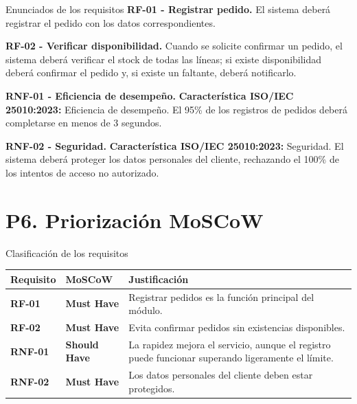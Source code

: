 \documentclass[11pt,a4paper]{article}
\renewcommand{\arraystretch}{1.25}
\begin{document}
\vspace{0.45cm}

\begin{taskbox}{Enunciados de los requisitos}
\textbf{RF-01 - Registrar pedido.} El sistema deberá registrar el pedido con los datos correspondientes.

\textbf{RF-02 - Verificar disponibilidad.} Cuando se solicite confirmar un pedido, el sistema deberá verificar el stock de todas las líneas; si existe disponibilidad deberá confirmar el pedido y, si existe un faltante, deberá notificarlo.

\textbf{RNF-01 - Eficiencia de desempeño.} \textbf{Característica ISO/IEC 25010:2023:} Eficiencia de desempeño. El 95\% de los registros de pedidos deberá completarse en menos de 3 segundos.

\textbf{RNF-02 - Seguridad.} \textbf{Característica ISO/IEC 25010:2023:} Seguridad. El sistema deberá proteger los datos personales del cliente, rechazando el 100\% de los intentos de acceso no autorizado.
\end{taskbox}

\section*{P6. Priorización MoSCoW}
\begin{taskbox}{Clasificación de los requisitos}
\small
\renewcommand{\arraystretch}{1.40}
\begin{tabularx}{\textwidth}{
  >{\centering\arraybackslash\bfseries}m{2.1cm}
  >{\centering\arraybackslash}m{2.8cm}
  >{\RaggedRight\arraybackslash}X
}
\toprule
\textbf{\textcolor{uteqblue}{Requisito}} &
\textbf{\textcolor{uteqblue}{MoSCoW}} &
\textbf{\textcolor{uteqblue}{Justificación}} \\
\midrule
RF-01 & \textcolor{uteqgreen}{\textbf{Must Have}} & Registrar pedidos es la función principal del módulo. \\
RF-02 & \textcolor{uteqgreen}{\textbf{Must Have}} & Evita confirmar pedidos sin existencias disponibles. \\
RNF-01 & \textcolor{uteqgreen}{\textbf{Should Have}} & La rapidez mejora el servicio, aunque el registro puede funcionar superando ligeramente el límite. \\
RNF-02 & \textcolor{uteqgreen}{\textbf{Must Have}} & Los datos personales del cliente deben estar protegidos. \\
\bottomrule
\end{tabularx}
\normalsize
\end{taskbox}
\end{document}
